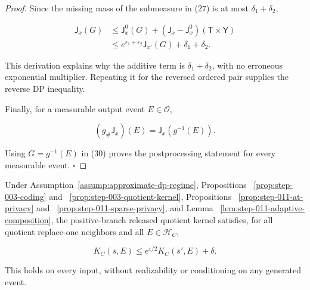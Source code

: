 \begin{proof}
Since the missing mass of the submeasure in (27) is at most
\(\delta_1+\delta_2\),

\[
\begin{aligned}
 \mathsf J_x(G)
 &\leq \mathsf J_x^0(G)
       +(\mathsf J_x-\mathsf J_x^0)
          (\mathsf T\times\mathsf Y)\\
 &\leq e^{\varepsilon_1+\varepsilon_2}
       \mathsf J_{x'}(G)+\delta_1+\delta_2.
\end{aligned}
\tag{30}
\]

This derivation explains why the additive term is
\(\delta_1+\delta_2\), with no erroneous exponential multiplier. Repeating
it for the reversed ordered pair supplies the reverse DP inequality.

Finally, for a measurable output event \(E\in\mathcal O\),

\[
 (g_\#\mathsf J_x)(E)
 =\mathsf J_x(g^{-1}(E)).
\]

Using \(G=g^{-1}(E)\) in (30) proves the postprocessing statement for every
measurable event. \(\square\)


\end{proof}

\begin{proposition}\label{prop:step-011-quotient-dp}
Under Assumption~\ref{assump:approximate-dp-regime},  Propositions
~\ref{prop:step-003-coding} and
~\ref{prop:step-003-quotient-kernel}, Propositions
~\ref{prop:step-011-at-privacy} and
~\ref{prop:step-011-sparse-privacy}, and Lemma
~\ref{lem:step-011-adaptive-composition}, the positive-branch released
quotient kernel satisfies, for all quotient replace-one neighbors and all
\(E\in\mathcal H_C\),

\[
 K_C(\bar s,E)
 \leq e^{\varepsilon/2}K_C(\bar s',E)+\delta.
\tag{31}
\]

This holds on every input, without realizability or conditioning on any
generated event.


\end{proposition}

